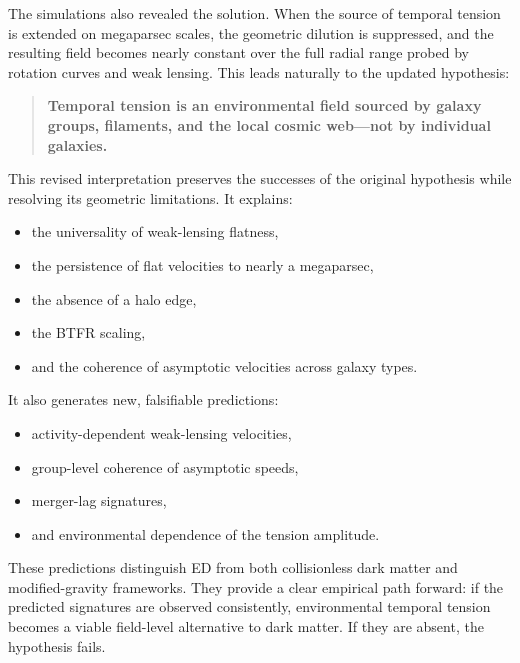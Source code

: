 The simulations also revealed the solution. When the source of temporal
tension is extended on megaparsec scales, the geometric dilution is
suppressed, and the resulting field becomes nearly constant over the
full radial range probed by rotation curves and weak lensing. This leads
naturally to the updated hypothesis:

\begin{quote}
\textbf{Temporal tension is an environmental field sourced by galaxy
groups, filaments, and the local cosmic web---not by individual
galaxies.}
\end{quote}

This revised interpretation preserves the successes of the original
hypothesis while resolving its geometric limitations. It explains:

\begin{itemize}
\tightlist
\item
  the universality of weak-lensing flatness,\\
\item
  the persistence of flat velocities to nearly a megaparsec,\\
\item
  the absence of a halo edge,\\
\item
  the BTFR scaling,\\
\item
  and the coherence of asymptotic velocities across galaxy types.
\end{itemize}

It also generates new, falsifiable predictions:

\begin{itemize}
\tightlist
\item
  activity-dependent weak-lensing velocities,\\
\item
  group-level coherence of asymptotic speeds,\\
\item
  merger-lag signatures,\\
\item
  and environmental dependence of the tension amplitude.
\end{itemize}

These predictions distinguish ED from both collisionless dark matter and
modified-gravity frameworks. They provide a clear empirical path
forward: if the predicted signatures are observed consistently,
environmental temporal tension becomes a viable field-level alternative
to dark matter. If they are absent, the hypothesis fails.

